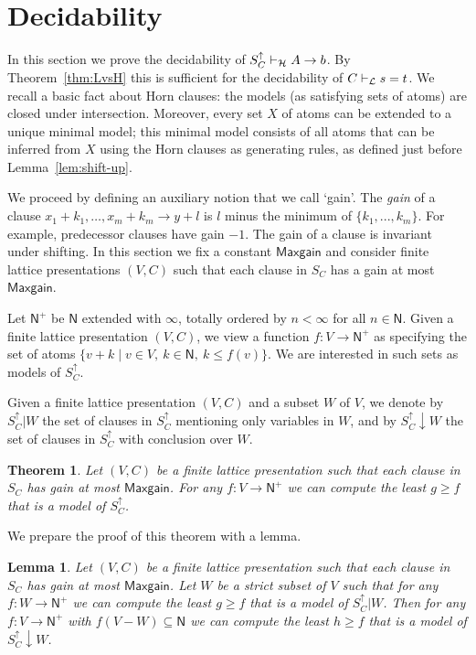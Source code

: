 \documentclass[11pt,a4paper]{article}
\newtheorem{theorem}{Theorem}[section]
\newtheorem{lemma}{Lemma}[theorem]
\newcommand{\N}{\mathsf{N}}
\newcommand\set[1]{\{#1\}}
\newcommand\jbody[3]{{{#1_1}+{#2_1}},\ldots,{{#1_#3}+{#2_#3}}}
\newcommand\lathy{{\cal L}}
\newcommand\prvL{\vdash_{\lathy}}
\newcommand\prvH{\vdash_{\cal H}}
\newcommand\Ninf{\N^+}
\newcommand\M{\mathsf{Maxgain}}
\begin{document}
\section{Decidability}

In this section we prove the decidability of $S^\uparrow_C\prvH A\to b$.
By Theorem~\ref{thm:LvsH} this is sufficient for
the decidability of $C\prvL s=t$. We recall a basic fact
about Horn clauses: the models (as satisfying sets of atoms)
are closed under intersection. Moreover, every set $X$ of atoms
can be extended to a unique minimal model; this minimal model
consists of all atoms that can be inferred from $X$ using the
Horn clauses as generating rules, as defined just before Lemma~\ref{lem:shift-up}. 

We proceed by defining an auxiliary notion that we call `gain'.
The \emph{gain} of a clause $\jbody{x}{k}{m}\to y+l$ is $l$ 
minus the minimum of $\set{k_1, ... ,k_m}$.
For example, predecessor clauses have gain $-1$.
The gain of a clause is invariant under shifting.
In this section we fix a constant $\M$ and consider
finite lattice presentations $(V,C)$ such that
each clause in $S_C$ has a gain at most $\M$.

Let $\Ninf$ be $\N$ extended with $\infty$, totally ordered
by $n < \infty$ for all $n\in\N$. 
Given a finite lattice presentation $(V,C)$, we view
a function $f: V\to\Ninf$ as specifying the set
of atoms $\set{v+k \mid v\in V,~k\in\N,~k \leq f(v)}$.
We are interested in such sets as models of $S^\uparrow_C$.

Given a finite lattice presentation $(V,C)$
and a subset $W$ of $V$, we denote by $S^\uparrow_C|W$ 
the set of clauses in $S^\uparrow_C$ mentioning only variables in $W$,
and by $S^\uparrow_C{\downarrow}W$
the set of clauses in $S^\uparrow_C$ with conclusion over $W$.

\begin{theorem}\label{thm:main}
Let  $(V,C)$ be a finite lattice presentation
such that each clause in $S_C$ has gain at most $\M$.
For any $f: V\to\Ninf$ we can compute
the least $g \geq f$ that is a model of $S^\uparrow_C$.
\end{theorem}

We prepare the proof of this theorem with a lemma.

\begin{lemma}\label{lem:secondary}
Let  $(V,C)$ be a finite lattice presentation
such that each clause in $S_C$ has gain at most $\M$.
Let $W$ be a strict subset of $V$ such that 
for any $f: W\to\Ninf$ we can compute
the least $g \geq f$ that is a model of $S^\uparrow_C|W$.
Then for any $f: V\to\Ninf$ with $f(V-W)\subseteq \N$ we can compute
the least $h \geq f$ that is a model of $S^\uparrow_C{\downarrow}W$.
\end{lemma}
\end{document}
